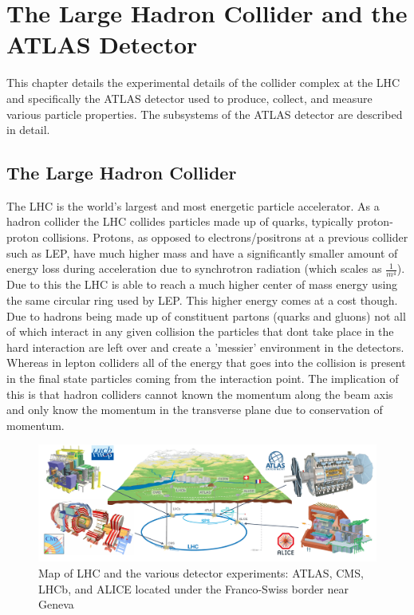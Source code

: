
\chapter{The Large Hadron Collider and the ATLAS Detector}
\label{ch:LHCDetector}

This chapter details the experimental details of the collider complex at the LHC and specifically the ATLAS detector used to produce, collect, and measure various particle properties.  The subsystems of the ATLAS detector are described in detail.
\section{The Large Hadron Collider}
\label{Section:LHC}
The LHC is the world's largest and most energetic particle accelerator.  As a hadron collider the LHC collides particles made up of quarks, typically proton-proton collisions.  Protons, as opposed to electrons/positrons at a previous collider such as LEP, have much higher mass and have a significantly smaller amount of energy loss during acceleration due to synchrotron radiation (which scales as $\frac{1}{m^4}$).  Due to this the LHC is able to reach a much higher center of mass energy using the same circular ring used by LEP.  
This higher energy comes at a cost though.  Due to hadrons being made up of constituent partons (quarks and gluons) not all of which interact in any given collision the particles that dont take place in the hard interaction are left over and create a 'messier' environment in the detectors.  Whereas in lepton colliders all of the energy that goes into the collision is present in the final state particles coming from the interaction point.  The implication of this is that hadron colliders cannot known the momentum along the beam axis and only know the momentum in the transverse plane due to conservation of momentum.

\begin{figure}[h!]
	\centering
	\includegraphics[width=\columnwidth]{../ThesisImages/LHCImages/LHCDetecPlacement.png}
	\caption[Map of LHC and the various detector experiments: ATLAS, CMS, LHCb, and ALICE located under the Franco-Swiss border near Geneva]{Map of LHC and the various detector experiments: ATLAS, CMS, LHCb, and ALICE  located under the Franco-Swiss border near Geneva\cite{ATLASCoords}}
	\label{fig:LHCDetPlace}
\end{figure}

